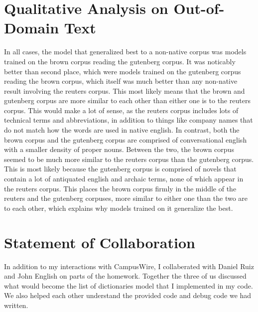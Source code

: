 \documentclass{article}
\begin{document}
\section{Qualitative Analysis on Out-of-Domain Text}
\quad In all cases, the model that generalized best to a non-native corpus was models trained on the brown corpus reading the gutenberg corpus. It was noticably better than second place, which were models trained on the gutenberg corpus reading the brown corpus, which itself was much better than any non-native result involving the reuters corpus. This most likely means that the brown and gutenberg corpus are more similar to each other than either one is to the reuters corpus. This would make a lot of sense, as the reuters corpus includes lots of technical terms and abbreviations, in addition to things like company names that do not match how the words are used in native english. In contrast, both the brown corpus and the gutenberg corpus are comprised of conversational english with a smaller density of proper nouns. Between the two, the brown corpus seemed to be much more similar to the reuters corpus than the gutenberg corpus. This is most likely because the gutenberg corpus is comprised of novels that contain a lot of antiquated english and archaic terms, none of which appear in the reuters corpus. This places the brown corpus firmly in the middle of the reuters and the gutenberg corpuses, more similar to either one than the two are to each other, which explains why models trained on it generalize the best.


\section{Statement of Collaboration}
\quad In addition to my interactions with CampusWire, I collaberated with Daniel Ruiz and John English on parts of the homework. Together the three of us discussed what would become the list of dictionaries model that I implemented in my code. We also helped each other understand the provided code and debug code we had written.
\end{document}
